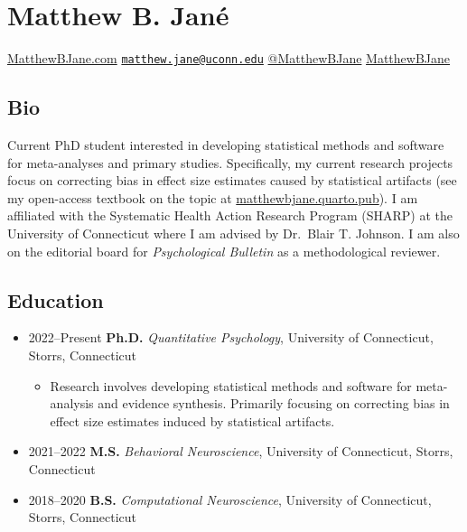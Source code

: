\documentclass[
  letterpaper,
  DIV=11,
  numbers=noendperiod]{scrartcl}
\author{}
\date{}
\providecommand{\tightlist}{%
  \setlength{\itemsep}{0pt}\setlength{\parskip}{0pt}}\usepackage{longtable,booktabs,array}
\begin{document}
\ifdefined\Shaded\renewenvironment{Shaded}{\begin{tcolorbox}[boxrule=0pt, breakable, interior hidden, frame hidden, borderline west={3pt}{0pt}{shadecolor}, sharp corners, enhanced]}{\end{tcolorbox}}\fi

\hypertarget{matthew-b.-januxe9}{%
\section{Matthew B. Jané}\label{matthew-b.-januxe9}}

 \href{https://www.matthewbjane.com}{MatthewBJane.com}
\textbar{} 
\href{mailto:matthew.jane@uconn.edu}{\nolinkurl{matthew.jane@uconn.edu}}
\textbar{} 
\href{https://www.twitter.com/MatthewBJane}{@MatthewBJane} \textbar{}
 \href{https://www.github.io/MatthewBJane}{MatthewBJane}

\hypertarget{bio}{%
\subsection{\texorpdfstring{ Bio}{ Bio}}\label{bio}}

Current PhD student interested in developing statistical methods and
software for meta-analyses and primary studies. Specifically, my current
research projects focus on correcting bias in effect size estimates
caused by statistical artifacts (see my open-access textbook on the
topic at
\href{https://matthewbjane.quarto.pub}{matthewbjane.quarto.pub}). I am
affiliated with the Systematic Health Action Research Program (SHARP) at
the University of Connecticut where I am advised by Dr.~Blair T.
Johnson. I am also on the editorial board for \emph{Psychological
Bulletin} as a methodological reviewer.

\hypertarget{education}{%
\subsection{\texorpdfstring{ Education}{ Education}}\label{education}}

\begin{itemize}
\item
  2022--Present \textbar{} \textbf{Ph.D.} \emph{Quantitative
  Psychology}, University of Connecticut, Storrs, Connecticut

  \begin{itemize}
  \tightlist
  \item
    Research involves developing statistical methods and software for
    meta-analysis and evidence synthesis. Primarily focusing on
    correcting bias in effect size estimates induced by statistical
    artifacts.
  \end{itemize}
\item
  2021--2022 \textbar{} \textbf{M.S.} \emph{Behavioral Neuroscience},
  University of Connecticut, Storrs, Connecticut
\item
  2018--2020 \textbar{} \textbf{B.S.} \emph{Computational Neuroscience},
  University of Connecticut, Storrs, Connecticut
\end{itemize}
\end{document}
